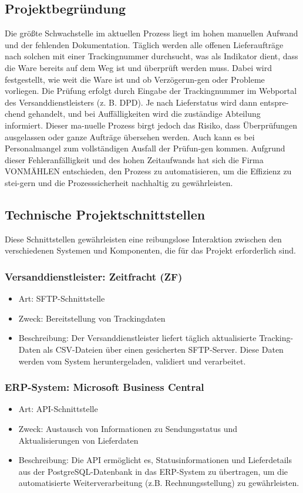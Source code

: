 \subsection{Projektbegründung} 
\label{sec:Projektbegruendung}
Die größte Schwachstelle im aktuellen Prozess liegt im hohen manuellen Aufwand und der fehlenden Dokumentation. 
Täglich werden alle offenen Lieferaufträge nach solchen mit einer Trackingnummer durchsucht, was als Indikator dient, 
dass die Ware bereits auf dem Weg ist und überprüft werden muss. Dabei wird festgestellt, wie weit die Ware ist und ob 
Verzögerun-gen oder Probleme vorliegen. Die Prüfung erfolgt durch Eingabe der Trackingnummer im Webportal des 
Versanddienstleisters (z. B. DPD). Je nach Lieferstatus wird dann entspre-chend gehandelt, und bei Auffälligkeiten 
wird die zuständige Abteilung informiert. Dieser ma-nuelle Prozess birgt jedoch das Risiko, dass Überprüfungen 
ausgelassen oder ganze Aufträge übersehen werden. Auch kann es bei Personalmangel zum vollständigen Ausfall der 
Prüfun-gen kommen. Aufgrund dieser Fehleranfälligkeit und des hohen Zeitaufwands hat sich die Firma VONMÄHLEN 
entschieden, den Prozess zu automatisieren, um die Effizienz zu stei-gern und die Prozesssicherheit nachhaltig zu 
gewährleisten.

\subsection{Technische Projektschnittstellen} 
\label{sec:Projektschnittstellen}
Diese Schnittstellen gewährleisten eine reibungslose Interaktion zwischen den verschiedenen Systemen und Komponenten, 
die für das Projekt erforderlich sind.

\subsubsection{Versanddienstleister: Zeitfracht (ZF)}
\begin{itemize}
\item Art: SFTP-Schnittstelle
\item Zweck: Bereitstellung von Trackingdaten
\item Beschreibung: Der Versanddienstleister liefert täglich aktualisierte Tracking-Daten als CSV-Dateien über einen 
gesicherten SFTP-Server. Diese Daten werden vom System heruntergeladen, validiert und verarbeitet.
\end{itemize}

\subsubsection{ERP-System: Microsoft Business Central}
\begin{itemize}
\item Art: API-Schnittstelle
\item Zweck: Austausch von Informationen zu Sendungsstatus und Aktualisierungen von Lieferdaten
\item Beschreibung: Die API ermöglicht es, Statusinformationen und Lieferdetails aus der 
PostgreSQL-Datenbank in das ERP-System zu übertragen, um die automatisierte Weiterverarbeitung 
(z.B. Rechnungsstellung) zu gewährleisten.
\end{itemize}

